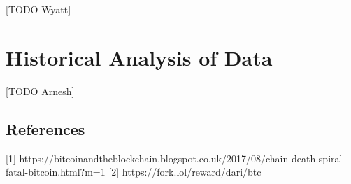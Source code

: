 \documentclass[10pt, preprint]{aastex}
\begin{document}
[TODO Wyatt]

\section{Historical Analysis of Data}
[TODO Arnesh]



\subsection{References}
[1] https://bitcoinandtheblockchain.blogspot.co.uk/2017/08/chain-death-spiral-fatal-bitcoin.html?m=1
[2] https://fork.lol/reward/dari/btc
\end{document}
